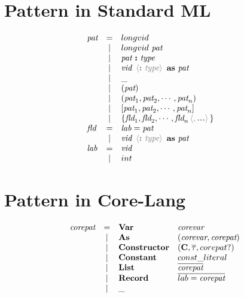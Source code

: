 \documentclass[11pt,a4paper]{article}
\newcommand{\key}[1]{\textrm{\textbf{#1}}}
\newcommand{\prodlhs}[1]{\textit{#1}}
\newcommand{\braced}[1]{\{#1\}}
\newcommand{\angled}[1]{\,{\color{gray}\langle#1\rangle}\,}
\newcommand{\vcon} {\mathbf{C}}
\newcommand{\vect}[1]{\overline{#1}}
\newcommand{\optional}[1]{#1?}
\begin{document}
\section {Pattern in Standard ML}
{\renewcommand{\arraystretch}{1.2}\[
\begin{array}{lcll}
\prodlhs{pat}
    & = & longvid                                                                   &\\        
    & | & longvid \ \prodlhs{pat}                                                   &\\
    & | & \prodlhs{pat}\ \key{:}\ \prodlhs{type}                                    &\\
    & | & \prodlhs{vid}\ \angled{\key{:}\ \prodlhs{type}}\ \key{as}\ \prodlhs{pat}  &\\
    & | & \_                                                                        &\\
    & | & (\prodlhs{pat})                                                           &\\
    & | & (\prodlhs{pat}_1,\prodlhs{pat}_2,\cdots,\prodlhs{pat}_n)                  &\\
    & | & [\prodlhs{pat}_1,\prodlhs{pat}_2,\cdots,\prodlhs{pat}_n]                  &\\
    & | & \braced{\prodlhs{fld}_1,\prodlhs{fld}_2,\cdots,\prodlhs{fld}_n\angled{,\key{...}}}  &\\
\prodlhs{fld}
    & = & \prodlhs{lab} = \prodlhs{pat}                                             &\\
    & | & \prodlhs{vid}\ \angled{\key{:}\ \prodlhs{type}}\ \key{as}\ \prodlhs{pat}  &\\
\prodlhs{lab}
    & = & \prodlhs{vid}                                                             &\\
    & | & int                                                                       &\\    
\end{array}
\]}

\section {Pattern in Core-Lang}
{\renewcommand{\arraystretch}{1.2}\[
\begin{array}{lcll}
\prodlhs{corepat}
    & = & \key{Var}         & \prodlhs{corevar}                                     \\        
    & | & \key{As}          & (\prodlhs{corevar},\prodlhs{corepat})  				\\
    & | & \key{Constructor} & (\vcon,\vect\tau,\optional{corepat})					\\
    & | & \key{Constant}	& const\_literal										\\
    & | & \key{List}        & \vect{\prodlhs{corepat}}								\\
    & | & \key{Record}      & \vect{lab = \prodlhs{corepat}} 		                \\
    & | & \_                                                                        \\
\end{array}
\]}
\end{document}
